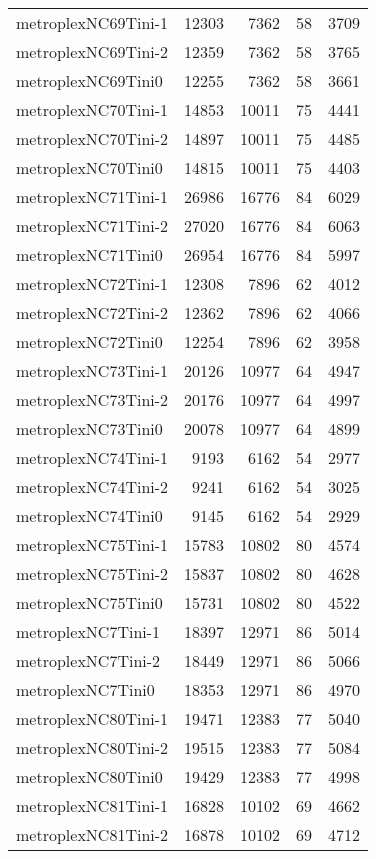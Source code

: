 \begin{tabular}{lrrrr}
metroplexNC69Tini-1 & 12303 & 7362 & 58 & 3709 \\
metroplexNC69Tini-2 & 12359 & 7362 & 58 & 3765 \\
metroplexNC69Tini0 & 12255 & 7362 & 58 & 3661 \\
metroplexNC70Tini-1 & 14853 & 10011 & 75 & 4441 \\
metroplexNC70Tini-2 & 14897 & 10011 & 75 & 4485 \\
metroplexNC70Tini0 & 14815 & 10011 & 75 & 4403 \\
metroplexNC71Tini-1 & 26986 & 16776 & 84 & 6029 \\
metroplexNC71Tini-2 & 27020 & 16776 & 84 & 6063 \\
metroplexNC71Tini0 & 26954 & 16776 & 84 & 5997 \\
metroplexNC72Tini-1 & 12308 & 7896 & 62 & 4012 \\
metroplexNC72Tini-2 & 12362 & 7896 & 62 & 4066 \\
metroplexNC72Tini0 & 12254 & 7896 & 62 & 3958 \\
metroplexNC73Tini-1 & 20126 & 10977 & 64 & 4947 \\
metroplexNC73Tini-2 & 20176 & 10977 & 64 & 4997 \\
metroplexNC73Tini0 & 20078 & 10977 & 64 & 4899 \\
metroplexNC74Tini-1 & 9193 & 6162 & 54 & 2977 \\
metroplexNC74Tini-2 & 9241 & 6162 & 54 & 3025 \\
metroplexNC74Tini0 & 9145 & 6162 & 54 & 2929 \\
metroplexNC75Tini-1 & 15783 & 10802 & 80 & 4574 \\
metroplexNC75Tini-2 & 15837 & 10802 & 80 & 4628 \\
metroplexNC75Tini0 & 15731 & 10802 & 80 & 4522 \\
metroplexNC7Tini-1 & 18397 & 12971 & 86 & 5014 \\
metroplexNC7Tini-2 & 18449 & 12971 & 86 & 5066 \\
metroplexNC7Tini0 & 18353 & 12971 & 86 & 4970 \\
metroplexNC80Tini-1 & 19471 & 12383 & 77 & 5040 \\
metroplexNC80Tini-2 & 19515 & 12383 & 77 & 5084 \\
metroplexNC80Tini0 & 19429 & 12383 & 77 & 4998 \\
metroplexNC81Tini-1 & 16828 & 10102 & 69 & 4662 \\
metroplexNC81Tini-2 & 16878 & 10102 & 69 & 4712 \\

\end{tabular}
